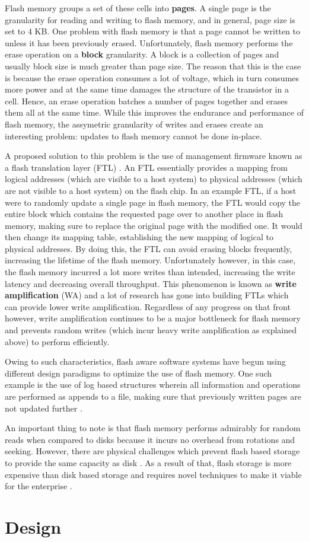 \documentclass[10pt, author, twocolumn]{article}
\begin{document}
Flash memory groups a set of these cells into \textbf{pages}. A single page is the granularity for reading and writing to flash memory, and in general, page size is set to 4 KB. One problem with flash memory is that a page cannot be written to unless it has been previously erased. Unfortunately, flash memory performs the erase operation on a \textbf{block} granularity. A block is a collection of pages and usually block size is much greater than page size. The reason that this is the case is because the erase operation consumes a lot of voltage, which in turn consumes more power and at the same time damages the structure of the transistor in a cell. Hence, an erase operation batches a number of pages together and erases them all at the same time. While this improves the endurance and performance of flash memory, the assymetric granularity of writes and erases create an interesting problem: updates to flash memory cannot be done in-place.

A proposed solution to this problem is the use of management firmware known as a flash translation layer (FTL) \cite{}. An FTL essentially provides a mapping from logical addresses (which are visible to a host system) to physical addresses (which are not visible to a host system) on the flash chip. In an example FTL, if a host were to randomly update a single page in flash memory, the FTL would copy the entire block which contains the requested page over to another place in flash memory, making sure to replace the original page with the modified one. It would then change its mapping table, establishing the new mapping of logical to physical addresses. By doing this, the FTL can avoid erasing blocks frequently, increasing the lifetime of the flash memory. Unfortunately however, in this case, the flash memory incurred a lot more writes than intended, increasing the write latency and decreasing overall throughput. This phenomenon is known as \textbf{write amplification} (WA) and a lot of research has gone into building FTLs which can provide lower write amplification. Regardless of any progress on that front however, write amplification continues to be a major bottleneck for flash memory and prevents random writes (which incur heavy write amplification as explained above) to perform efficiently.

Owing to such characteristics, flash aware software systems have begun using different design paradigms to optimize the use of flash memory. One such example is the use of log based structures wherein all information and operations are performed as appends to a file, making sure that previously written pages are not updated further \cite{}. 

An important thing to note is that flash memory performs admirably for random reads when compared to disks because it incurs no overhead from rotations and seeking. However, there are physical challenges which prevent flash based storage to provide the same capacity as disk \cite{}. As a result of that, flash storage is more expensive than disk based storage and requires novel techniques to make it viable for the enterprise \cite{}. 

\section{Design}
	 
\end{document}
